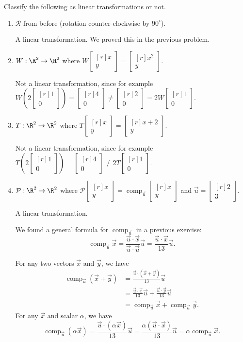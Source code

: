 \documentclass{problemset}
\DeclareMathOperator{\Comp}{comp}
\newcommand{\mat}[1]{\begin{bmatrix*}[r]#1\end{bmatrix*}}
\begin{document}
	\begin{parts}
		\item Classify the following as linear transformations or not.
			\begin{enumerate}
				\item $\mathcal R$ from before (rotation counter-clockwise by $90^\circ$).
					\begin{solution}
						A linear transformation. We proved this in the previous problem.
					\end{solution}
				\item $W:\R^2\to\R^2$ where $W\mat{x\\y}=\mat{x^2\\y}$.
					\begin{solution}
						Not a linear transformation, since for example
						$W\left(2\mat{1\\0}\right)=\mat{4\\0}\neq\mat{2\\0}=2W\mat{1\\0}$.
					\end{solution}
				\item $T:\R^2\to\R^2$ where $T\mat{x\\y}=\mat{x+2\\y}$.
					\begin{solution}
						Not a linear transformation, since for example
						$T\left(2\mat{1\\0}\right) = \mat{4\\0} \neq 2T\mat{1\\0}$.
					\end{solution}
				\item $\mathcal P:\R^2\to\R^2$ where
					$\mathcal P\mat{x\\y}=\Comp_{\vec u}\mat{x\\y}$ and
					$\vec u=\mat{2\\3}$.
					\begin{solution}
						A linear transformation.

						We found a general formula for $\Comp_{\vec u}$ in a previous
						exercise:
						\[
							\Comp_{\vec u}\vec x
							=\frac{\vec u\cdot\vec x}{\vec u\cdot\vec u}\vec u
							=\frac{\vec u\cdot\vec x}{13}\vec u.
						\]

						For any two vectors $\vec x$ and $\vec y$, we have
						\begin{align*}
							\Comp_{\vec u}(\vec x + \vec y)&=\frac{\vec u\cdot(\vec x + \vec y)}{13}\vec u\\
							&=\frac{\vec u\cdot\vec x}{13}\vec u + \frac{\vec u\cdot\vec y}{13}\vec u\\
							&=\Comp_{\vec u}\vec x + \Comp_{\vec u}\vec y.
						\end{align*}
						For any $\vec x$ and scalar $\alpha$, we have
						\[
							\Comp_{\vec u}(\alpha\vec x)
							=\frac{\vec u\cdot(\alpha\vec x)}{13}\vec u
							=\frac{\alpha(\vec u\cdot\vec x)}{13}\vec u
							=\alpha\Comp_{\vec u}\vec x.
						\]
					\end{solution}
			\end{enumerate}
	\end{parts}
\end{document}
